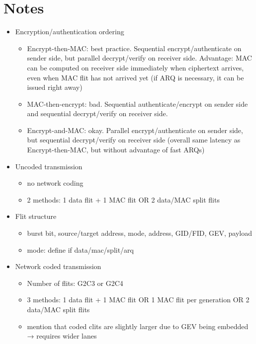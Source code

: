 \iffalse
\section{Notes}
\begin{itemize}
    \item Encryption/authentication ordering
        \begin{itemize}
            \item Encrypt-then-MAC: best practice. Sequential encrypt/authenticate on sender side, but parallel decrypt/verify
                on receiver side. Advantage: MAC can be computed on receiver side immediately when ciphertext arrives, even when
                MAC flit has not arrived yet (if ARQ is necessary, it can be issued right away)
            \item MAC-then-encrypt: bad. Sequential authenticate/encrypt on sender side and sequential decrypt/verify on receiver
                side.
            \item Encrypt-and-MAC: okay. Parallel encrypt/authenticate on sender side, but sequential decrypt/verify on receiver
                side (overall same latency as Encrypt-then-MAC, but without advantage of fast ARQs)
        \end{itemize}
    \item Uncoded transmission
        \begin{itemize}
            \item no network coding
            \item 2 methods: 1 data flit + 1 MAC flit OR 2 data/MAC split flits
        \end{itemize}
    \item Flit structure
        \begin{itemize}
            \item burst bit, source/target address, mode, address, GID/FID, GEV, payload
            \item mode: define if data/mac/split/arq
        \end{itemize}
    \item Network coded transmission
        \begin{itemize}
            \item Number of flits: G2C3 or G2C4
            \item 3 methods: 1 data flit + 1 MAC flit OR 1 MAC flit per generation OR 2 data/MAC split flits
            \item mention that coded clits are slightly larger due to GEV being embedded → requires wider lanes

\end{itemize}
\end{itemize}

